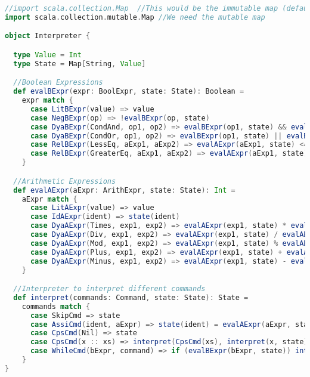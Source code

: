 \begin{lstlisting}[language=Scala]
//import scala.collection.Map  //This would be the immutable map (default)
import scala.collection.mutable.Map //We need the mutable map

object Interpreter {

  type Value = Int
  type State = Map[String, Value]

  //Boolean Expressions
  def evalBExpr(expr: BoolExpr, state: State): Boolean =
    expr match {
      case LitBExpr(value) => value
      case NegBExpr(op) => !evalBExpr(op, state)
      case DyaBExpr(CondAnd, op1, op2) => evalBExpr(op1, state) && evalBExpr(op2, state)
      case DyaBExpr(CondOr, op1, op2) => evalBExpr(op1, state) || evalBExpr(op2, state)
      case RelBExpr(LessEq, aExp1, aExp2) => evalAExpr(aExp1, state) <= evalAExpr(aExp2, state)
      case RelBExpr(GreaterEq, aExp1, aExp2) => evalAExpr(aExp1, state) >= evalAExpr(aExp2, state)
    }

  //Arithmetic Expressions
  def evalAExpr(aExpr: ArithExpr, state: State): Int =
    aExpr match {
      case LitAExpr(value) => value
      case IdAExpr(ident) => state(ident)
      case DyaAExpr(Times, exp1, exp2) => evalAExpr(exp1, state) * evalAExpr(exp2, state)
      case DyaAExpr(Div, exp1, exp2) => evalAExpr(exp1, state) / evalAExpr(exp2, state)
      case DyaAExpr(Mod, exp1, exp2) => evalAExpr(exp1, state) % evalAExpr(exp2, state)
      case DyaAExpr(Plus, exp1, exp2) => evalAExpr(exp1, state) + evalAExpr(exp2, state)
      case DyaAExpr(Minus, exp1, exp2) => evalAExpr(exp1, state) - evalAExpr(exp2, state)
    }

  //Interpreter to interpret different commands
  def interpret(commands: Command, state: State): State =
    commands match {
      case SkipCmd => state
      case AssiCmd(ident, aExpr) => state(ident) = evalAExpr(aExpr, state); state
      case CpsCmd(Nil) => state
      case CpsCmd(x :: xs) => interpret(CpsCmd(xs), interpret(x, state))
      case WhileCmd(bExpr, command) => if (evalBExpr(bExpr, state)) interpret(command, state) else state
    }
}
\end{lstlisting}

\clearpage